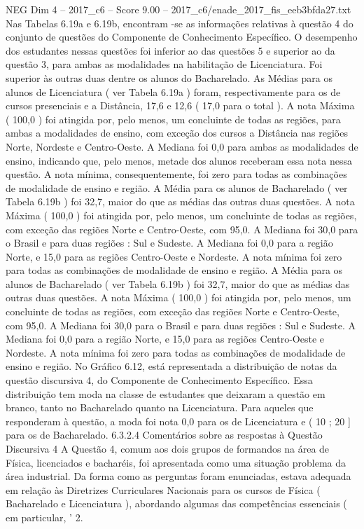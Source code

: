 \begin{textsample}{NEG Dim 4 – 2017\_c6 – Score 9.00 – 2017\_c6/enade\_2017\_fis\_eeb3bfda27.txt}
Nas Tabelas 6.19a e 6.19b, encontram -se as informações relativas à questão 4 do conjunto de questões do Componente de Conhecimento Específico.
O desempenho dos estudantes nessas questões foi inferior ao das questões 5 e superior ao da questão 3, para ambas as modalidades na habilitação de Licenciatura.
Foi superior às outras duas dentre os alunos do Bacharelado.
As Médias para os alunos de Licenciatura ( ver Tabela 6.19a ) foram, respectivamente para os de cursos presenciais e a Distância, 17,6 e 12,6 ( 17,0 para o total ).
A nota Máxima ( 100,0 ) foi atingida por, pelo menos, um concluinte de todas as regiões, para ambas a modalidades de ensino, com exceção dos cursos a Distância nas regiões Norte, Nordeste e Centro-Oeste.
A Mediana foi 0,0 para ambas as modalidades de ensino, indicando que, pelo menos, metade dos alunos receberam essa nota nessa questão.
A nota mínima, consequentemente, foi zero para todas as combinações de modalidade de ensino e região.
A Média para os alunos de Bacharelado ( ver Tabela 6.19b ) foi 32,7, maior do que as médias das outras duas questões.
A nota Máxima ( 100,0 ) foi atingida por, pelo menos, um concluinte de todas as regiões, com exceção das regiões Norte e Centro-Oeste, com 95,0.
A Mediana foi 30,0 para o Brasil e para duas regiões : Sul e Sudeste.
A Mediana foi 0,0 para a região Norte, e 15,0 para as regiões Centro-Oeste e Nordeste.
A nota mínima foi zero para todas as combinações de modalidade de ensino e região.
A Média para os alunos de Bacharelado ( ver Tabela 6.19b ) foi 32,7, maior do que as médias das outras duas questões.
A nota Máxima ( 100,0 ) foi atingida por, pelo menos, um concluinte de todas as regiões, com exceção das regiões Norte e Centro-Oeste, com 95,0.
A Mediana foi 30,0 para o Brasil e para duas regiões : Sul e Sudeste.
A Mediana foi 0,0 para a região Norte, e 15,0 para as regiões Centro-Oeste e Nordeste.
A nota mínima foi zero para todas as combinações de modalidade de ensino e região.
No Gráfico 6.12, está representada a distribuição de notas da questão discursiva 4, do Componente de Conhecimento Específico.
Essa distribuição tem moda na classe de estudantes que deixaram a questão em branco, tanto no Bacharelado quanto na Licenciatura.
Para aqueles que responderam à questão, a moda foi nota 0,0 para os de Licenciatura e ( 10 ; 20 ] para os de Bacharelado. 6.3.2.4 Comentários sobre as respostas à Questão Discursiva 4 A Questão 4, comum aos dois grupos de formandos na área de Física, licenciados e bacharéis, foi apresentada como uma situação problema da área industrial.
Da forma como as perguntas foram enunciadas, estava adequada em relação às Diretrizes Curriculares Nacionais para os cursos de Física ( Bacharelado e Licenciatura ), abordando algumas das competências essenciais ( em particular, ' 2.

\end{textsample}
